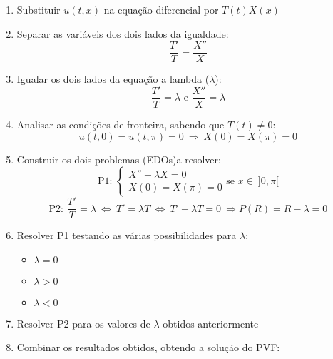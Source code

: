 \documentclass[11pt, a4paper]{article}
\begin{document}
\begin{enumerate}
    \item Substituir $u(t, x)$ na equação diferencial por $T(t)X(x)$
    \item Separar as variáveis dos dois lados da igualdade:
          \begin{equation*}
              \frac{T'}{T} = \frac{X''}{X}
          \end{equation*}
    \item Igualar os dois lados da equação a lambda ($\lambda$):
          \begin{equation*}
              \frac{T'}{T} = \lambda \text{\ \ \ \ e \ \ \ }
              \frac{X''}{X} = \lambda
          \end{equation*}
    \item Analisar as condições de fronteira, sabendo que $T(t) \neq 0$:
          \begin{equation*}
              u(t, 0) = u(t, \pi) = 0 \ \Rightarrow\ X(0) = X(\pi) = 0
          \end{equation*}
    \item Construir os dois problemas (EDOs)a resolver:
          \begin{equation*}
              \text{P1:\ \ \ }
              \begin{cases}
                  X'' - \lambda X = 0 \\
                  X(0) = X(\pi) = 0
              \end{cases}
              \text{se $x \in\ ]0, \pi[$}
          \end{equation*}
          \begin{equation*}
              \text{P2:\ \ \ } \frac{T'}{T} = \lambda \ \Leftrightarrow \
              T' = \lambda T \ \Leftrightarrow \
              T' - \lambda T = 0 \ \Rightarrow
              P(R) = R-\lambda = 0
          \end{equation*}
    \item Resolver P1 testando as várias possibilidades para $\lambda$:
          \begin{itemize}
              \item $\lambda = 0$
              \item $\lambda > 0$
              \item $\lambda < 0$
          \end{itemize}
    \item Resolver P2 para os valores de $\lambda$ obtidos anteriormente
    \item Combinar os resultados obtidos, obtendo a solução do PVF:

\end{enumerate}
\end{document}
